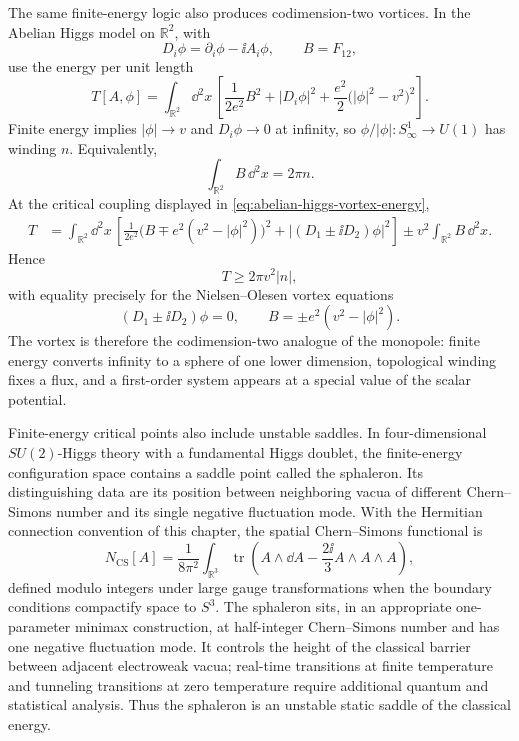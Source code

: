 The same finite-energy logic also produces codimension-two vortices.  In the
Abelian Higgs model on \(\mathbb R^2\), with
\[
  D_i\phi=\partial_i\phi-\ii A_i\phi,\qquad
  B=F_{12},
\]
use the energy per unit length
\begin{equation}
  T[A,\phi]
  =
  \int_{\mathbb R^2}\dd^2x\,
  \left[
    \frac1{2e^2}B^2
    +|D_i\phi|^2
    +\frac{e^2}{2}\bigl(|\phi|^2-v^2\bigr)^2
  \right].
  \label{eq:abelian-higgs-vortex-energy}
\end{equation}
Finite energy implies \(|\phi|\to v\) and \(D_i\phi\to0\) at infinity, so
\(\phi/|\phi|:S^1_\infty\to U(1)\) has winding \(n\).  Equivalently,
\[
  \int_{\mathbb R^2}B\,\dd^2x=2\pi n .
\]
At the critical coupling displayed in
\eqref{eq:abelian-higgs-vortex-energy},
\begin{align}
  T
  &=
  \int_{\mathbb R^2}\dd^2x\,
  \left[
    \frac1{2e^2}\bigl(B\mp e^2(v^2-|\phi|^2)\bigr)^2
    + |(D_1\pm\ii D_2)\phi|^2
  \right]
  \pm v^2\int_{\mathbb R^2}B\,\dd^2x .
  \label{eq:vortex-bogomolny-completion}
\end{align}
Hence
\[
  T\ge 2\pi v^2 |n|,
\]
with equality precisely for the Nielsen--Olesen vortex equations
\[
  (D_1\pm\ii D_2)\phi=0,
  \qquad
  B=\pm e^2(v^2-|\phi|^2).
\]
The vortex is therefore the codimension-two analogue of the monopole:
finite energy converts infinity to a sphere of one lower dimension,
topological winding fixes a flux, and a first-order system appears at a
special value of the scalar potential.

Finite-energy critical points also include unstable saddles.  In
four-dimensional \(SU(2)\)-Higgs theory with a fundamental Higgs doublet, the
finite-energy configuration space contains a saddle point called the
sphaleron.  Its distinguishing data are its position between neighboring vacua
of different Chern--Simons number and its single negative fluctuation mode.
With the Hermitian connection convention of this
chapter, the spatial Chern--Simons functional is
\begin{equation}
  N_{\mathrm{CS}}[A]
  =
  \frac1{8\pi^2}
  \int_{\mathbb R^3}
  \operatorname{tr}\left(
    A\wedge \dd A-\frac{2\ii}{3}A\wedge A\wedge A
  \right),
  \label{eq:spatial-chern-simons-functional}
\end{equation}
defined modulo integers under large gauge transformations when the boundary
conditions compactify space to \(S^3\).  The sphaleron sits, in an appropriate
one-parameter minimax construction, at half-integer Chern--Simons number and
has one negative fluctuation mode.  It controls the height of the classical
barrier between adjacent electroweak vacua; real-time transitions at finite
temperature and tunneling transitions at zero temperature require additional
quantum and statistical analysis.  Thus the sphaleron is an unstable static
saddle of the classical energy.

